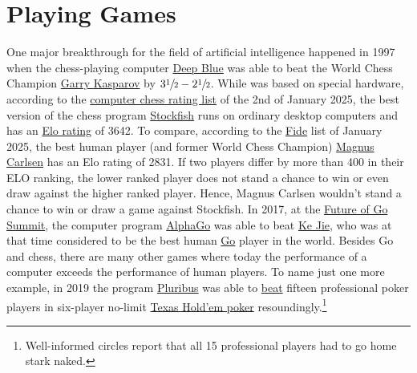 \chapter{Playing Games}
One major breakthrough for the field of artificial intelligence happened in 1997 when the chess-playing computer
\href{https://en.wikipedia.org/wiki/Deep_Blue_(chess_computer)}{Deep Blue} was able to beat the World Chess
Champion \href{https://en.wikipedia.org/wiki/Garry_Kasparov}{Garry Kasparov} by $3\sfrac{1}{2}-2\sfrac{1}{2}$.
While   was based on special hardware, according to the
\href{http://www.computerchess.org.uk/ccrl/4040/rating_list_all.html}{computer chess rating list} of the 2nd
of January 2025, the best version of the chess program
\href{https://en.wikipedia.org/wiki/Stockfish_(chess)}{Stockfish} runs 
on ordinary desktop computers and has an \href{https://en.wikipedia.org/wiki/Elo_rating_system}{Elo rating} of 3642.  
To compare, according to the
\href{https://ratings.fide.com/top.phtml?list=men}{Fide} list of January 2025, the best human player (and former
World Chess Champion) \href{https://en.wikipedia.org/wiki/Magnus_Carlsen}{Magnus Carlsen} has an Elo rating of
2831.  If two players differ by more than 400 in their ELO ranking, the lower ranked player does not stand a
chance to win or even draw against the higher ranked player. Hence, Magnus Carlsen wouldn't stand a chance to
win or draw a game against Stockfish.  In 2017, at the  
\href{https://en.wikipedia.org/wiki/Future_of_Go_Summit}{Future of Go Summit},  the computer program
\href{https://en.wikipedia.org/wiki/AlphaGo}{AlphaGo}  was able to beat
\href{https://en.wikipedia.org/wiki/Ke_Jie}{Ke Jie},  
who was at that time considered to be the best human
\href{https://en.wikipedia.org/wiki/Go_(game)}{Go} player in the world. 
Besides Go and chess, there are many other games where today the performance of a computer exceeds the
performance of human players.  To name just one more example, in 2019 the program
\href{https://en.wikipedia.org/wiki/Pluribus_(poker_bot)}{Pluribus}  was able to  
\href{https://arstechnica.com/science/2019/07/facebook-ai-pluribus-defeats-top-poker-professionals-in-6-player-texas-holdem/}{beat}
fifteen professional poker players in six-player no-limit 
\href{https://en.wikipedia.org/wiki/Texas_hold_%27em}{Texas Hold'em poker} resoundingly.\footnote{
  Well-informed circles report that all 15 professional players had to go home stark naked.
}

